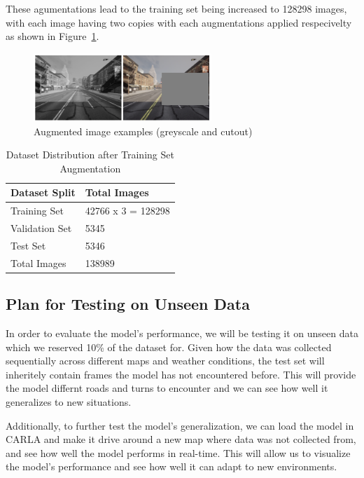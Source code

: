 \documentclass{article} %
\begin{document}
These agumentations lead to the training set being increased to 128298 images, with each image having two copies with each augmentations applied respecivelty as shown in Figure~\ref{fig:exampleofaugmented}.

\begin{figure}[H] %
    \centering
    \includegraphics[width=0.6\textwidth]{exampleofaugmented.png} %
    \caption{Augmented image examples (greyscale and cutout)}
    \label{fig:exampleofaugmented}
\end{figure}


\begin{table}[h]
\centering
\caption{Dataset Distribution after Training Set Augmentation}
\vspace{0.5em}
\begin{tabular}{|p{2cm}|p{2cm}|}
\hline
\textbf{Dataset Split} & \textbf{Total Images} \\ \hline
Training Set           & 42766 x 3 =  128298\\ \hline
Validation Set         & 5345 \\ \hline
Test Set               & 5346 \\ \hline
Total Images           & 138989 \\ \hline
\end{tabular}
\end{table}


\subsection{Plan for Testing on Unseen Data}

In order to evaluate the model's performance, we will be testing it on unseen data which we reserved 10\% of the dataset for. Given how 
the data was collected sequentially across different maps and weather conditions, the test set will inheritely contain frames the model has not encountered before.
This will provide the model differnt roads and turns to encounter and we can see how well it generalizes to new situations.

Additionally, to further test the model's generalization, we can load the model in CARLA and make it drive around a new map where data was not collected from, and see how well the model performs in 
real-time. This will allow us to visualize the model's performance and see how well it can adapt to new environments.
\end{document}
